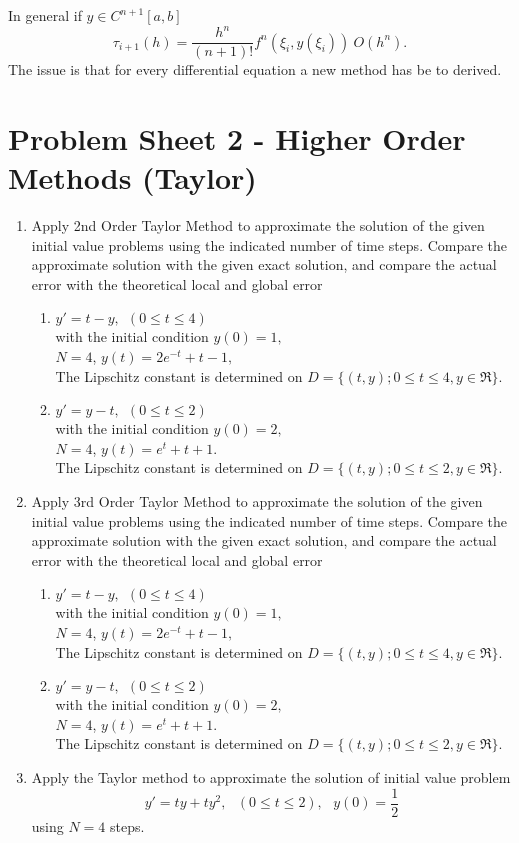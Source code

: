 In general if $y \in C^{n+1}[a,b]$
\[\tau_{i+1}(h)=\frac{h^n}{(n+1)!}f^{n}(\xi_i,y(\xi_i))~O(h^n). \]
The issue is that for every differential equation a new method has be to derived.

\newpage
\section{Problem Sheet 2 - Higher Order Methods (Taylor)}
\begin{enumerate}

\item
Apply 2nd Order Taylor Method to approximate the solution of the given initial value problems using the indicated number of time steps. Compare the approximate solution with the given exact solution, and compare the actual error with the theoretical local and global error
\begin{enumerate}
\item
$y'=t-y, \ \ (0\leq t \leq 4)$\\
with the initial condition $y(0)=1,$\\
$N=4$, 
$y(t)=2e^{-t}+t-1,$\\

The Lipschitz constant is determined on  $D=\{(t,y);0\leq t \leq 4, y\in \Re \}.$
\item 
$y'=y-t, \ \ (0\leq t \leq 2)$\\
with the initial condition $y(0)=2,$\\
$N=4$, 
$y(t)=e^{t}+t+1$.\\

The Lipschitz constant is determined on  $D=\{(t,y);0\leq t \leq 2, y\in \Re \}.$
\end{enumerate}
\item
Apply 3rd Order Taylor Method to approximate the solution of the given initial value problems using the indicated number of time steps. Compare the approximate solution with the given exact solution, and compare the actual error with the theoretical local and global error
\begin{enumerate}
\item
$y'=t-y, \ \ (0\leq t \leq 4)$\\
with the initial condition $y(0)=1,$\\
$N=4$, 
$y(t)=2e^{-t}+t-1,$\\

The Lipschitz constant is determined on  $D=\{(t,y);0\leq t \leq 4, y\in \Re \}.$
\item 
$y'=y-t, \ \ (0\leq t \leq 2)$\\
with the initial condition $y(0)=2,$\\
$N=4$, 
$y(t)=e^{t}+t+1$.\\

The Lipschitz constant is determined on  $D=\{(t,y);0\leq t \leq 2, y\in \Re \}.$
\end{enumerate}
\item
Apply the Taylor method to approximate the solution of initial value problem
\[ y'=ty+ty^2, \ \ \ (0\leq t \leq 2), \ \ \ y(0)=\frac{1}{2} \]
using $N=4$ steps.
\end{enumerate}
\newpage
